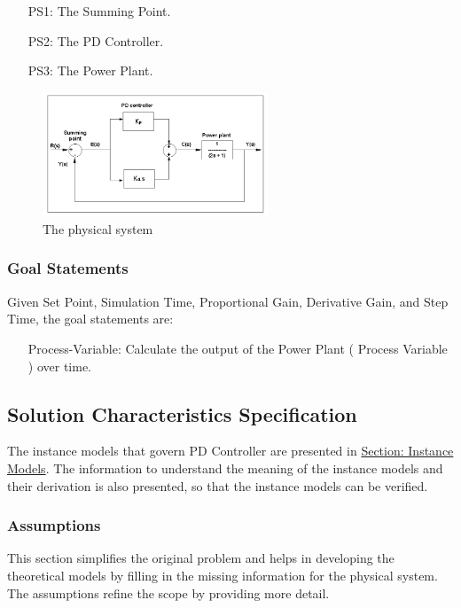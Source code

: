\documentclass[12pt]{article}
\begin{document}
\begin{itemize}
\item[PS1:]{The Summing Point.}
\item[PS2:]{The PD Controller.}
\item[PS3:]{The Power Plant.}
\end{itemize}
\begin{figure}
\begin{center}
\includegraphics[width=0.6\textwidth]{../../../datafiles/PIDController/Fig_PDController.png}
\caption{The physical system}
\label{Figure:pidSysDiagram}
\end{center}
\end{figure}
\subsubsection{Goal Statements}
\label{Sec:GoalStmt}
Given Set Point, Simulation Time, Proportional Gain, Derivative Gain, and Step Time, the goal statements are:

\begin{itemize}
\item[Process-Variable:\phantomsection\label{processVariable}]{Calculate the output of the Power Plant ( Process Variable ) over time.}
\end{itemize}
\subsection{Solution Characteristics Specification}
\label{Sec:SolCharSpec}
The instance models that govern PD Controller are presented in \hyperref[Sec:IMs]{Section: Instance Models}. The information to understand the meaning of the instance models and their derivation is also presented, so that the instance models can be verified.

\subsubsection{Assumptions}
\label{Sec:Assumps}
This section simplifies the original problem and helps in developing the theoretical models by filling in the missing information for the physical system. The assumptions refine the scope by providing more detail.
\end{document}
